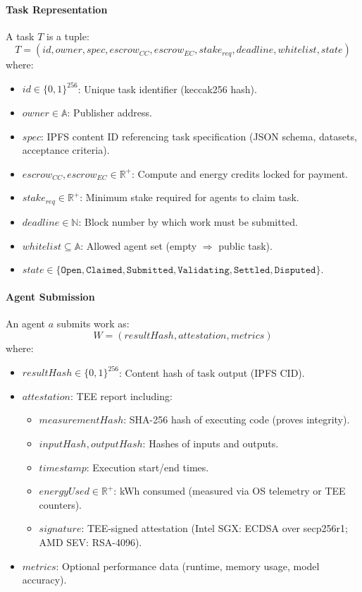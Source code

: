 \documentclass[11pt]{article}
\begin{document}
\paragraph{Task Representation} A task $T$ is a tuple:
\begin{equation}
T = (id, owner, spec, escrow_{CC}, escrow_{EC}, stake_{req}, deadline, whitelist, state)
\end{equation}
where:
\begin{itemize}[noitemsep]
  \item $id \in \{0,1\}^{256}$: Unique task identifier (keccak256 hash).
  \item $owner \in \mathbb{A}$: Publisher address.
  \item $spec$: IPFS content ID referencing task specification (JSON schema, datasets, acceptance criteria).
  \item $escrow_{CC}, escrow_{EC} \in \mathbb{R}^+$: Compute and energy credits locked for payment.
  \item $stake_{req} \in \mathbb{R}^+$: Minimum stake required for agents to claim task.
  \item $deadline \in \mathbb{N}$: Block number by which work must be submitted.
  \item $whitelist \subseteq \mathbb{A}$: Allowed agent set (empty $\Rightarrow$ public task).
  \item $state \in \{\texttt{Open}, \texttt{Claimed}, \texttt{Submitted}, \texttt{Validating}, \texttt{Settled}, \texttt{Disputed}\}$.
\end{itemize}

\paragraph{Agent Submission} An agent $a$ submits work as:
\begin{equation}
W = (resultHash, attestation, metrics)
\end{equation}
where:
\begin{itemize}[noitemsep]
  \item $resultHash \in \{0,1\}^{256}$: Content hash of task output (IPFS CID).
  \item $attestation$: TEE report including:
    \begin{itemize}[noitemsep]
      \item $measurementHash$: SHA-256 hash of executing code (proves integrity).
      \item $inputHash, outputHash$: Hashes of inputs and outputs.
      \item $timestamp$: Execution start/end times.
      \item $energyUsed \in \mathbb{R}^+$: kWh consumed (measured via OS telemetry or TEE counters).
      \item $signature$: TEE-signed attestation (Intel SGX: ECDSA over secp256r1; AMD SEV: RSA-4096).
    \end{itemize}
  \item $metrics$: Optional performance data (runtime, memory usage, model accuracy).
\end{itemize}
\end{document}
